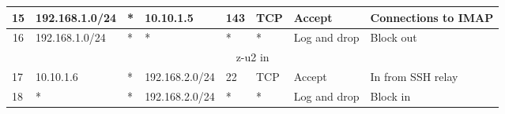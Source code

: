 \documentclass[a4paper, 11pt, oneside]{article}
\begin{document}
\begin{table}[H]
{\begin{tabular}{|llllllll|}
\multicolumn{1}{|l|}{15}                        & \multicolumn{1}{l|}{192.168.1.0/24}                                               & \multicolumn{1}{l|}{*}                                                              & \multicolumn{1}{l|}{10.10.1.5}                                                         & \multicolumn{1}{l|}{143}                                                                 & \multicolumn{1}{l|}{TCP}               & \multicolumn{1}{l|}{Accept}          & Connections to IMAP                    \\ \hline
\multicolumn{1}{|c|}{{\color[HTML]{000000} 16}} & \multicolumn{1}{l|}{192.168.1.0/24}                                               & \multicolumn{1}{l|}{*}                                                              & \multicolumn{1}{l|}{*}                                                                 & \multicolumn{1}{l|}{*}                                                                   & \multicolumn{1}{l|}{*}                 & \multicolumn{1}{l|}{Log and drop}    & Block out                              \\ \hline
\multicolumn{8}{|c|}{{\color[HTML]{FE0000} z-u2 in}}                                                                                                                                                                                                                                                                                                                                                                                                                                                                                   \\ \hline
\multicolumn{1}{|l|}{17}                        & \multicolumn{1}{l|}{10.10.1.6}                                                    & \multicolumn{1}{l|}{*}                                                              & \multicolumn{1}{l|}{192.168.2.0/24}                                                    & \multicolumn{1}{l|}{22}                                                                  & \multicolumn{1}{l|}{TCP}               & \multicolumn{1}{l|}{Accept}          & In from SSH relay                      \\ \hline
\multicolumn{1}{|l|}{18}                        & \multicolumn{1}{l|}{*}                                                            & \multicolumn{1}{l|}{*}                                                              & \multicolumn{1}{l|}{192.168.2.0/24}                                                    & \multicolumn{1}{l|}{*}                                                                   & \multicolumn{1}{l|}{*}                 & \multicolumn{1}{l|}{Log and drop}    & Block in                               \\ \hline

\end{tabular}}
\end{table}
\end{document}
